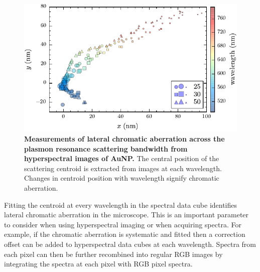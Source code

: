 \documentclass{article}
\begin{document}
\begin{figure}[bt]
\centering
\includegraphics{figures/lateral_chromatic_aberration}
\caption[Measurements of lateral chromatic aberration across the plasmon resonance scattering bandwidth from hyperspectral images of AuNP.]{\textbf{Measurements of lateral chromatic aberration across the plasmon resonance scattering bandwidth from hyperspectral images of AuNP.} The central position of the scattering centroid is extracted from images at each wavelength. Changes in centroid position with wavelength signify chromatic aberration.}
\label{fig:lateral_chromatic_aberration}
\end{figure}

Fitting the centroid at every wavelength in the spectral data cube identifies lateral chromatic aberration in the microscope. This is an important parameter to consider when using hyperspectral imaging or when acquiring spectra. For example, if the chromatic aberration is systematic and fitted then a correction offset can be added to hyperspectral data cubes at each wavelength. Spectra from each pixel can then be further recombined into regular RGB images by integrating the spectra at each pixel with RGB pixel spectra.
\end{document}

